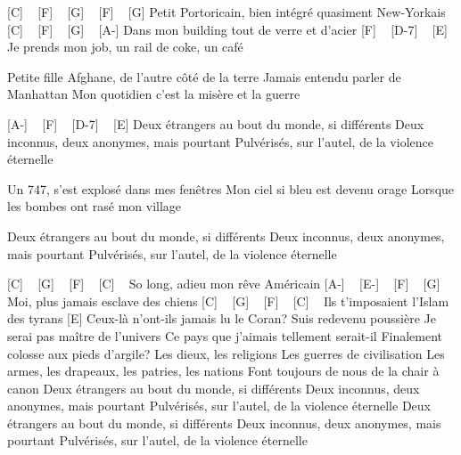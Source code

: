 [C] ~ [F] ~ [G] ~ [F] ~ [G]
Petit Portoricain, bien intégré quasiment New-Yorkais
[C] ~ [F] ~ [G] ~ [A-]
Dans mon building tout de verre et d'acier
[F] ~ [D-7] ~ [E]
Je prends mon job, un rail de coke, un café

Petite fille Afghane, de l'autre côté de la terre
Jamais entendu parler de Manhattan
Mon quotidien c'est la misère et la guerre

[A-] ~ [F] ~ [D-7] ~ [E]
Deux étrangers au bout du monde, si différents
Deux inconnus, deux anonymes, mais pourtant
Pulvérisés, sur l'autel, de la violence éternelle

Un 747, s'est explosé dans mes fenêtres
Mon ciel si bleu est devenu orage
Lorsque les bombes ont rasé mon village

Deux étrangers au bout du monde, si différents
Deux inconnus, deux anonymes, mais pourtant
Pulvérisés, sur l'autel, de la violence éternelle

[C] ~ [G] ~ [F] ~ [C] ~
So long, adieu mon rêve Américain
[A-] ~ [E-] ~ [F] ~ [G]~
Moi, plus jamais esclave des chiens
[C] ~ [G] ~ [F] ~ [C] ~
Ils t'imposaient l'Islam des tyrans
[E]
Ceux-là n'ont-ils jamais lu le Coran?
Suis redevenu poussière
Je serai pas maître de l'univers
Ce pays que j'aimais tellement serait-il
Finalement colosse aux pieds d'argile?
Les dieux, les religions
Les guerres de civilisation
Les armes, les drapeaux, les patries, les nations
Font toujours de nous de la chair à canon
Deux étrangers au bout du monde, si différents
Deux inconnus, deux anonymes, mais pourtant
Pulvérisés, sur l'autel, de la violence éternelle
Deux étrangers au bout du monde, si différents
Deux inconnus, deux anonymes, mais pourtant
Pulvérisés, sur l'autel, de la violence éternelle